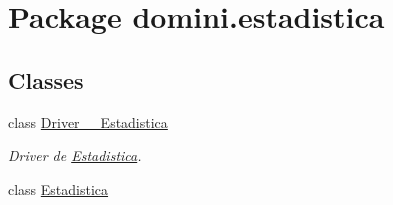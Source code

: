 \hypertarget{namespacedomini_1_1estadistica}{}\section{Package domini.\+estadistica}
\label{namespacedomini_1_1estadistica}
\subsection*{Classes}
\begin{DoxyCompactItemize}
\item 
class \hyperlink{classdomini_1_1estadistica_1_1Driver____Estadistica}{Driver\+\_\+\+\_\+\+Estadistica}
\begin{DoxyCompactList}\small\item\em Driver de \hyperlink{classdomini_1_1estadistica_1_1Estadistica}{Estadistica}. \end{DoxyCompactList}\item 
class \hyperlink{classdomini_1_1estadistica_1_1Estadistica}{Estadistica}
\end{DoxyCompactItemize}
